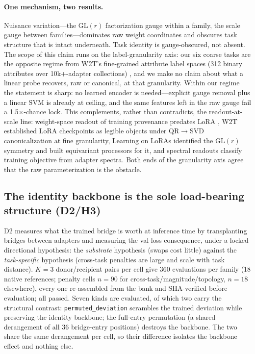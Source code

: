 \documentclass{article}
\begin{document}
\paragraph{One mechanism, two results.} Nuisance variation---the
$\mathrm{GL}(r)$ factorization gauge within a family, the scale gauge
between families---dominates raw weight coordinates and obscures task
structure that is intact underneath. Task identity is gauge-obscured, not
absent. The scope of this claim runs on the label-granularity axis: our six
coarse tasks are the opposite regime from W2T's fine-grained attribute
label spaces (312 binary attributes over 10k+-adapter collections)
\cite{w2t2026lora}, and we make no claim about what a linear probe
recovers, raw or canonical, at that granularity. Within our regime the
statement is sharp: no learned encoder is needed---explicit gauge removal
plus a linear SVM is already at ceiling, and the same features left in the
raw gauge fail a 1.5$\times$-chance lock. This complements, rather than
contradicts, the readout-at-scale line: weight-space readout of training
provenance predates LoRA \cite{eilertsen2020classify,unterthiner2020predict},
W2T \cite{w2t2026lora} established LoRA checkpoints as legible objects
under QR$\rightarrow$SVD canonicalization at fine granularity, Learning on
LoRAs \cite{putterman2024lol} identified the $\mathrm{GL}(r)$ symmetry and
built equivariant processors for it, and spectral readouts
\cite{paul2026spectral} classify training objective from adapter spectra.
Both ends of the granularity axis agree that the raw parameterization is
the obstacle.

\subsection{The identity backbone is the sole load-bearing structure (D2/H3)}
\label{sec:d2}

D2 measures what the trained bridge is worth at inference time by
transplanting bridges between adapters and measuring the val-loss
consequence, under a locked directional hypothesis: the \emph{substrate}
hypothesis (swaps cost little) against the \emph{task-specific} hypothesis
(cross-task penalties are large and scale with task distance). $K = 3$
donor/recipient pairs per cell give 360 evaluations per family (18 native
references; penalty cells $n = 90$ for cross-task/magnitude/topology,
$n = 18$ elsewhere), every one re-assembled from the bank and SHA-verified
before evaluation; all passed. Seven kinds are evaluated, of which two
carry the structural contrast: \texttt{permuted\_deviation} scrambles the
trained deviation while preserving the identity backbone; the full-entry
permutation (a shared derangement of all 36 bridge-entry positions)
destroys the backbone. The two share the same derangement per cell, so
their difference isolates the backbone effect and nothing else.
\end{document}
